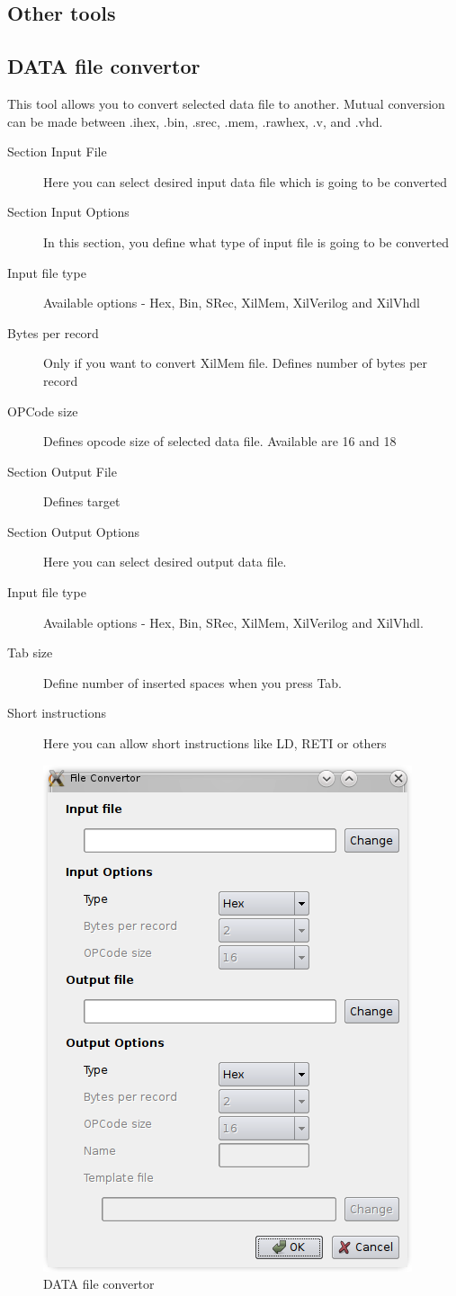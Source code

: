 \subsection{Other tools}

\subsection{DATA file convertor}
    This tool allows you to convert selected data file to another. Mutual conversion can be made between .ihex, .bin,
    .srec, .mem, .rawhex, .v, and .vhd.
    \begin{description}
        \item[Section Input File] Here you can select desired input data file which is going to be converted
        \item[Section Input Options] In this section, you define what type of input file is going to be converted
        \item[Input file type] Available options - Hex, Bin, SRec, XilMem, XilVerilog and XilVhdl
        \item[Bytes per record] Only if you want to convert XilMem file. Defines number of bytes per record
        \item[OPCode size] Defines opcode size of selected data file. Available are 16 and 18
        \item[Section Output File] Defines target
        \item[Section Output Options] Here you can select desired output data file.
        \item[Input file type] Available options - Hex, Bin, SRec, XilMem, XilVerilog and XilVhdl.
        \item[Tab size]  Define number of inserted spaces when you press Tab.
        \item[Short instructions] Here you can allow short instructions like LD, RETI or others
    \end{description}

    \begin{figure}[h]
        \centering{}
        \includegraphics[width=.5\textwidth]{img/DATA_convertor.png}
        \caption{DATA file convertor}
    \end{figure}

